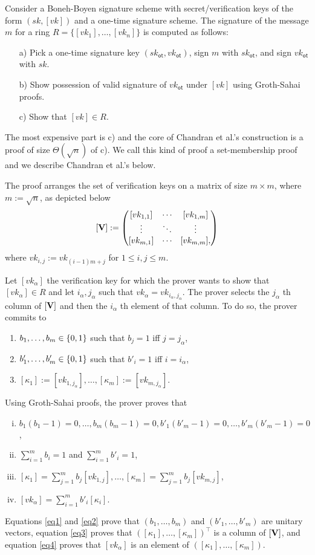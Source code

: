 Consider a {Boneh-Boyen signature scheme} with secret/verification keys of the form $(sk,[vk])$ and a {one-time signature scheme}. The signature of the message $m$ for a ring $R=\{[vk_1],\ldots,[vk_n]\}$ is computed as follows:
\begin{itemize}
	\item[a)] Pick a one-time signature key $(sk_\mathsf{ot},vk_\mathsf{ot})$, sign $m$ with $sk_\mathsf{ot}$, and sign $vk_\mathsf{ot}$ with $sk$.
	\item[b)] Show possession of valid signature of $vk_\mathsf{ot}$ under $[vk]$ using Groth-Sahai proofs.
	\item[c)] Show that $[vk]\in R$.
\end{itemize}
The most expensive part is c) and the core of Chandran et al.'s construction is a proof of size $\Theta(\sqrt{n})$ of c). We call this kind of proof a set-membership proof and we describe Chandran et al.'s below.
 
The proof arranges the set of verification keys on a matrix of size $m\times m$, where $m:=\sqrt{n}$, as depicted below
$$
[\mathbf{{V}}]:=
\begin{pmatrix}
[vk_{1,1}] & \cdots & [vk_{1,m}]\\
\vdots     & \ddots & \vdots \\
[vk_{m,1}]  & \cdots & [vk_{m,m}],
\end{pmatrix}
$$
where $vk_{i,j}:=vk_{(i-1)m+j}$ for $1\leq i,j \leq m$.

Let $[vk_\alpha]$ the verification key for which the prover wants to show that $[vk_\alpha]\in R$ and let $i_\alpha,j_\alpha$ such that $vk_\alpha = vk_{i_\alpha,j_\alpha}$. The prover selects the $j_\alpha$ th column of $[\mathbf{{V}}]$ and then the $i_\alpha$ th element of that column. To do so, the prover commits to 
\begin{enumerate}
\item $b_1,\ldots,b_m\in\{0,1\}$ such that $b_j=1$ iff $j=j_\alpha$,
\item $b'_1,\ldots,b'_m\in\{0,1\}$ such that $b'_i=1$ iff $i=i_\alpha$,
\item $[\kappa_1]:=[vk_{1,j_\alpha}],\ldots,[\kappa_m]:=[vk_{m,j_\alpha}]$.
\end{enumerate}

Using Groth-Sahai proofs, the prover proves that
\begin{enumerate}[i.]
\item $b_1(b_1-1)=0,\ldots,b_m(b_m-1)=0,b'_1(b'_m-1)=0,\ldots,b'_m(b'_m-1)=0$,\label{eq1}
\item $\sum_{i=1}^m b_i =1$ and $\sum_{i=1}^m b'_i=1$,\label{eq2}
\item $[\kappa_1]=\sum_{j=1}^m b_j [vk_{1,j}],\ldots,[\kappa_m]=\sum_{j=1}^m b_j[vk_{m,j}]$,\label{eq3}
\item $[vk_\alpha]=\sum_{i=1}^m b'_i[\kappa_i]$.\label{eq4}
\end{enumerate}
Equations \ref{eq1} and \ref{eq2} prove that $(b_1,\ldots,b_m)$ and $(b'_1,\ldots,b'_m)$ are unitary vectors, equation \ref{eq3} proves that $([\kappa_1],\ldots,[\kappa_m])^\top$ is a column of $[\mathbf{{V}}]$, and equation \ref{eq4} proves that $[vk_\alpha]$ is an element of $([\kappa_1],\ldots,[\kappa_m])$.
